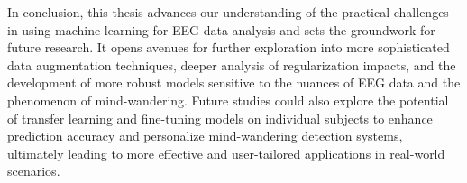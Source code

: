 In conclusion, this thesis advances our understanding of the practical challenges in using machine learning for EEG data analysis and sets the groundwork for future research. It opens avenues for further exploration into more sophisticated data augmentation techniques, deeper analysis of regularization impacts, and the development of more robust models sensitive to the nuances of EEG data and the phenomenon of mind-wandering. Future studies could also explore the potential of transfer learning and fine-tuning models on individual subjects to enhance prediction accuracy and personalize mind-wandering detection systems, ultimately leading to more effective and user-tailored applications in real-world scenarios.